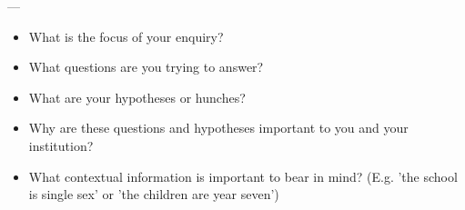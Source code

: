 ---
\begin{itemize}

\item  What is the focus of your enquiry?
\item What questions are you trying to answer?
\item What are your hypotheses or hunches?
\item Why are these questions and hypotheses important to you and your institution?
\item What contextual information is important to bear in mind? (E.g. 'the school is single sex' or 'the children are year seven')

\end{itemize}